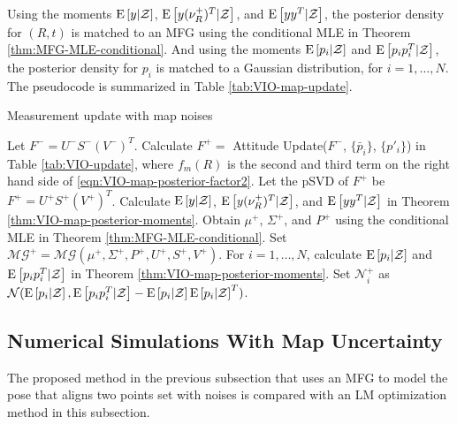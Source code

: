 Using the moments $\mathrm{E}\left[ y|\mathcal{Z} \right]$, $\mathrm{E}\left[ y(\nu_R^+)^T|\mathcal{Z} \right]$, and $\mathrm{E}\left[ yy^T|\mathcal{Z} \right]$, the posterior density for $(R,t)$ is matched to an MFG using the conditional MLE in Theorem \ref{thm:MFG-MLE-conditional}.
And using the moments $\mathrm{E}\left[ p_i|\mathcal{Z} \right]$ and $\mathrm{E}\left[ p_ip_i^T|\mathcal{Z} \right]$, the posterior density for $p_i$ is matched to a Gaussian distribution, for $i=1,\ldots,N$.
The pseudocode is summarized in Table \ref{tab:VIO-map-update}.

\begin{table}
	\caption{Measurement update with map noises}
	\label{tab:VIO-map-update}
	\begin{algorithmic}[1]
		\algrule[0.8pt]
		\algrule
		\State Let $F^- = U^-S^-(V^-)^T$.
		\State Calculate $F^+=$ Attitude Update($F^-$, $\{\bar{p}_i\}$, $\{p'_i\}$) in Table \ref{tab:VIO-update}, where $f_m(R)$ is the second and third term on the right hand side of \eqref{eqn:VIO-map-posterior-factor2}.
		\State Let the pSVD of $F^+$ be $F^+ = U^+S^+(V^+)^T$.
		\State Calculate $\mathrm{E}\left[ y|\mathcal{Z} \right]$, $\mathrm{E}\left[ y(\nu_R^+)^T|\mathcal{Z} \right]$, and $\mathrm{E}\left[ yy^T|\mathcal{Z} \right]$ in Theorem \ref{thm:VIO-map-posterior-moments}.
		\State Obtain $\mu^+$, $\Sigma^+$, and $P^+$ using the conditional MLE in Theorem \ref{thm:MFG-MLE-conditional}.
		\State Set $\mathcal{MG}^+ = \mathcal{MG}(\mu^+,\Sigma^+,P^+,U^+,S^+,V^+)$.
		\State For $i=1,\ldots,N$, calculate $\mathrm{E}\left[ p_i|\mathcal{Z} \right]$ and $\mathrm{E}\left[ p_ip_i^T|\mathcal{Z} \right]$ in Theorem \ref{thm:VIO-map-posterior-moments}.
		\State Set $\mathcal{N}_i^+$ as $\mathcal{N}(\mathrm{E}\left[ p_i|\mathcal{Z} \right], \mathrm{E}\left[ p_ip_i^T|\mathcal{Z} \right]-\mathrm{E}\left[ p_i|\mathcal{Z} \right]\mathrm{E}\left[ p_i|\mathcal{Z} \right]^T)$.
		\EndProcedure
		\algrule[0.8pt]
	\end{algorithmic}
\end{table}

\subsection{Numerical Simulations With Map Uncertainty}

The proposed method in the previous subsection that uses an MFG to model the pose that aligns two points set with noises is compared with an LM optimization method in this subsection.

